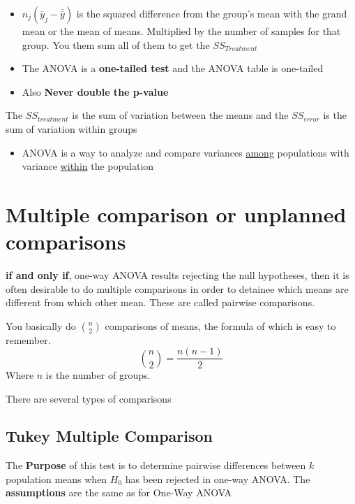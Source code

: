 \documentclass[../STAT-252-Notes.tex]{subfiles}
\begin{document}
\begin{Note}
  \begin{itemize}
    \item  
      $n_j(\overline{y}_j - \overline{\overline{y}}) $ is the squared difference from the group's mean with the grand mean or the mean of means. Multiplied by the number of samples for that group. You them sum all of them to get the $SS_{Treatment}$ 

    \item The ANOVA is a \textbf{one-tailed test} and the ANOVA table is one-tailed   

    \item Also \textbf{Never double the p-value}
  \end{itemize}
\end{Note}


The $SS_{treatment} $ is the sum of variation between the means and the $SS_{error}$ is the sum of variation within groups 








\begin{Review}
  \begin{itemize}
    \item  ANOVA is a way to analyze and compare variances \underline{among} populations with variance \underline{within} the population
  \end{itemize}
\end{Review}


\section{Multiple comparison or unplanned comparisons}
\textbf{if and only if}, one-way ANOVA results rejecting the null hypotheses, then it is often desirable to do multiple comparisons in order to detainee which means are different from which other mean. These are called pairwise comparisons.

You basically do $n\choose 2$ comparisons of means, the formula of which is easy to remember.
\[ 
  {n \choose 2} = \frac{n(n-1)}{2}     
\] 
Where $n $ is the number of groups.

There are several types of comparisons

\subsection{Tukey Multiple Comparison}
The \textbf{Purpose} of this test is to determine pairwise differences between $k$ population means when $H_0$ has been rejected in one-way ANOVA.
The \textbf{assumptions} are the same as for One-Way ANOVA
~\\~\\
\end{document}
